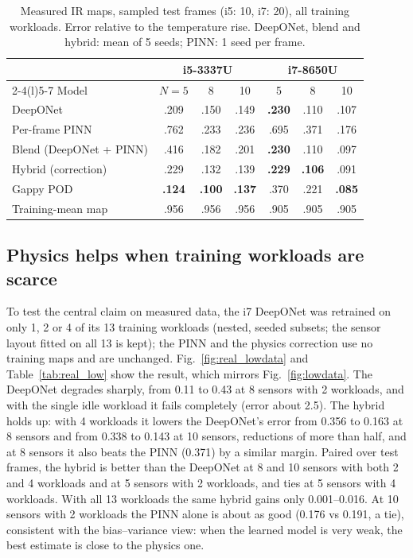 \documentclass[journal]{IEEEtran}
\newcommand{\best}[1]{\textbf{#1}}
\begin{document}
\begin{table}[t]
\caption{Measured IR maps, sampled test frames (i5: 10, i7: 20), all training workloads. Error relative to the temperature rise. DeepONet, blend and hybrid: mean of 5 seeds; PINN: 1 seed per frame.}
\label{tab:real_frames}
\centering
\footnotesize
\setlength{\tabcolsep}{2.4pt}
\begin{tabular}{@{}l ccc ccc@{}}
\toprule
& \multicolumn{3}{c}{i5-3337U} & \multicolumn{3}{c}{i7-8650U} \\
\cmidrule(lr){2-4}\cmidrule(l){5-7}
Model & $N{=}5$ & 8 & 10 & 5 & 8 & 10 \\
\midrule
DeepONet & .209 & .150 & .149 & \best{.230} & .110 & .107 \\
Per-frame PINN & .762 & .233 & .236 & .695 & .371 & .176 \\
Blend (DeepONet + PINN) & .416 & .182 & .201 & \best{.230} & .110 & .097 \\
Hybrid (correction) & .229 & .132 & .139 & \best{.229} & \best{.106} & .091 \\
Gappy POD & \best{.124} & \best{.100} & \best{.137} & .370 & .221 & \best{.085} \\
Training-mean map & .956 & .956 & .956 & .905 & .905 & .905 \\
\bottomrule
\end{tabular}
\end{table}

\subsection{Physics helps when training workloads are scarce}
To test the central claim on measured data, the i7 DeepONet was retrained on only 1, 2 or 4 of its 13 training workloads (nested, seeded subsets; the sensor layout fitted on all 13 is kept); the PINN and the physics correction use no training maps and are unchanged.
Fig.~\ref{fig:real_lowdata} and Table~\ref{tab:real_low} show the result, which mirrors Fig.~\ref{fig:lowdata}.
The DeepONet degrades sharply, from 0.11 to 0.43 at 8 sensors with 2 workloads, and with the single idle workload it fails completely (error about 2.5).
The hybrid holds up: with 4 workloads it lowers the DeepONet's error from 0.356 to 0.163 at 8 sensors and from 0.338 to 0.143 at 10 sensors, reductions of more than half, and at 8 sensors it also beats the PINN (0.371) by a similar margin.
Paired over test frames, the hybrid is better than the DeepONet at 8 and 10 sensors with both 2 and 4 workloads and at 5 sensors with 2 workloads, and ties at 5 sensors with 4 workloads.
With all 13 workloads the same hybrid gains only 0.001--0.016.
At 10 sensors with 2 workloads the PINN alone is about as good (0.176 vs 0.191, a tie), consistent with the bias--variance view: when the learned model is very weak, the best estimate is close to the physics one.
\end{document}
